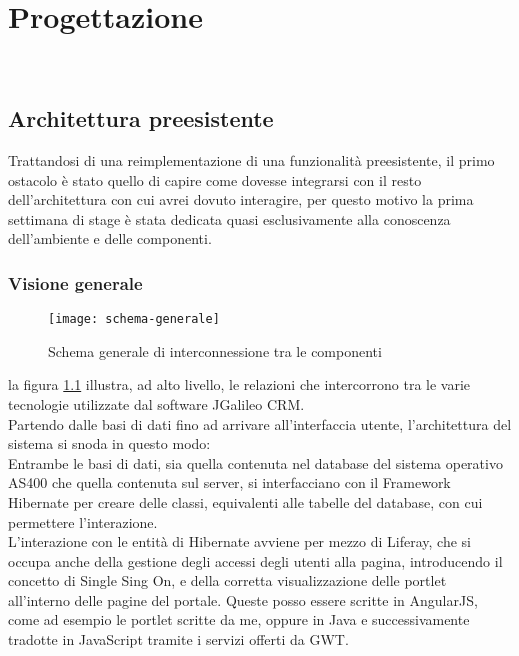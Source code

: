 
\chapter{Progettazione}
\label{cap:progettazione}

\\ %

\section{Architettura preesistente}
Trattandosi di una reimplementazione di una funzionalità preesistente, il primo ostacolo è stato quello di capire come dovesse integrarsi con il resto dell'architettura con cui avrei dovuto interagire, per questo motivo la prima settimana di stage è stata dedicata quasi esclusivamente alla conoscenza dell'ambiente e delle componenti. \\
\subsection{Visione generale}

\begin{figure}[h]
	\centering
	\texttt{[image: schema-generale]}
	\caption{Schema generale di interconnessione tra le componenti}
	\label{schema-generale}
\end{figure}
la figura \ref{schema-generale} illustra, ad alto livello, le relazioni che intercorrono tra le varie tecnologie utilizzate dal software JGalileo CRM.\\
Partendo dalle basi di dati fino ad arrivare all'interfaccia utente, l'architettura del sistema si snoda in questo modo:\\
Entrambe le basi di dati, sia quella contenuta nel database del sistema operativo AS400 che quella contenuta sul server, si interfacciano con il Framework Hibernate per creare delle classi, equivalenti alle tabelle del database, con cui permettere l'interazione.\\
L'interazione con le entità di Hibernate avviene per mezzo di Liferay, che si occupa anche della gestione degli accessi degli utenti alla pagina, introducendo il concetto di Single Sing On, e della corretta visualizzazione delle portlet all'interno delle pagine del portale. Queste posso essere scritte in AngularJS, come ad esempio le portlet scritte da me, oppure in Java e successivamente tradotte in JavaScript tramite i servizi offerti da GWT.
	